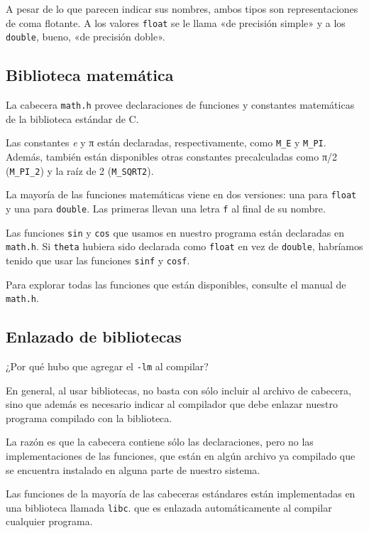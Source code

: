 A pesar de lo que parecen indicar sus nombres, ambos tipos son
representaciones de coma flotante. A los valores \lstinline!float! se le
llama «de precisión simple» y a los \lstinline!double!, bueno, «de
precisión doble».

\subsection{Biblioteca matemática}

La cabecera \lstinline!math.h! provee declaraciones de funciones y
constantes matemáticas de la biblioteca estándar de C.

Las constantes \emph{e} y π están declaradas, respectivamente, como
\lstinline!M_E! y \lstinline!M_PI!. Además, también están disponibles
otras constantes precalculadas como π/2 (\lstinline!M_PI_2!) y la raíz
de 2 (\lstinline!M_SQRT2!).

La mayoría de las funciones matemáticas viene en dos versiones: una para
\lstinline!float! y una para \lstinline!double!. Las primeras llevan una
letra \lstinline!f! al final de su nombre.

Las funciones \lstinline!sin! y \lstinline!cos! que usamos en nuestro
programa están declaradas en \lstinline!math.h!. Si \lstinline!theta!
hubiera sido declarada como \lstinline!float! en vez de
\lstinline!double!, habríamos tenido que usar las funciones
\lstinline!sinf! y \lstinline!cosf!.

Para explorar todas las funciones que están disponibles, consulte el
manual de \lstinline!math.h!.

\subsection{Enlazado de bibliotecas}

¿Por qué hubo que agregar el \lstinline!-lm! al compilar?

En general, al usar bibliotecas, no basta con sólo incluir al archivo de
cabecera, sino que además es necesario indicar al compilador que debe
enlazar nuestro programa compilado con la biblioteca.

La razón es que la cabecera contiene sólo las declaraciones, pero no las
implementaciones de las funciones, que están en algún archivo ya
compilado que se encuentra instalado en alguna parte de nuestro sistema.

Las funciones de la mayoría de las cabeceras estándares están
implementadas en una biblioteca llamada \lstinline!libc!. que es
enlazada automáticamente al compilar cualquier programa.

